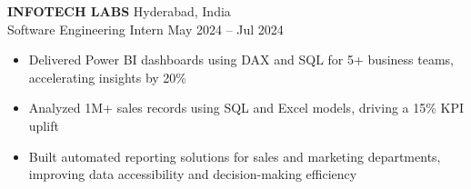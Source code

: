 \documentclass[letterpaper,10pt]{article}
\begin{document}
\textbf{INFOTECH LABS} \hfill Hyderabad, India \\
Software Engineering Intern \hfill May 2024 – Jul 2024
\begin{itemize}[leftmargin=*,label=\textbullet]
    \item Delivered Power BI dashboards using DAX and SQL for 5+ business teams, accelerating insights by 20\%
    \item Analyzed 1M+ sales records using SQL and Excel models, driving a 15\% KPI uplift
    \item Built automated reporting solutions for sales and marketing departments, improving data accessibility and decision-making efficiency
\end{itemize}
\end{document}
